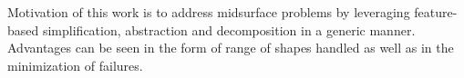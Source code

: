Motivation of this work  is to address midsurface problems by leveraging feature-based simplification, abstraction and decomposition in a generic manner. Advantages can be seen in the form of range of shapes handled as well as in the minimization of failures.


%
%
%





